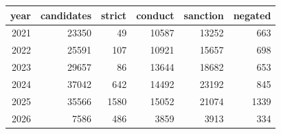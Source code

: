\begin{table}[htbp]
\centering
\label{tab:candidates_by_year}
\begin{tabular}{rrrrrr}
\toprule
year & candidates & strict & conduct & sanction & negated \\
\midrule
2021 & 23350 & 49 & 10587 & 13252 & 663 \\
2022 & 25591 & 107 & 10921 & 15657 & 698 \\
2023 & 29657 & 86 & 13644 & 18682 & 653 \\
2024 & 37042 & 642 & 14492 & 23192 & 845 \\
2025 & 35566 & 1580 & 15052 & 21074 & 1339 \\
2026 & 7586 & 486 & 3859 & 3913 & 334 \\
\bottomrule
\end{tabular}
\end{table}
